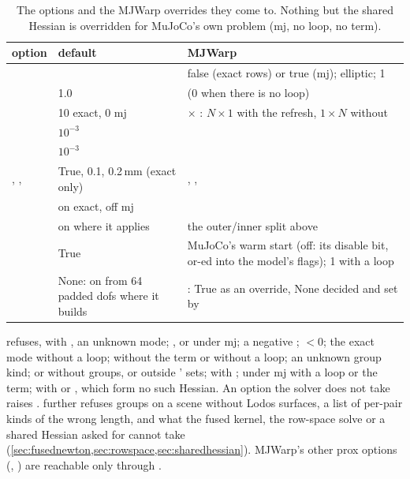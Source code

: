 \begin{table}[t]
\centering
\caption{The options and the MJWarp overrides they come to. Nothing but the shared Hessian is overridden for MuJoCo's own problem (mj, no loop, no term).}
\label{tab:pcmap}
\small
\begin{tabularx}{\linewidth}{@{}L{40mm}L{30mm}Y@{}}
\toprule
option & default & MJWarp \\
\midrule
{} &  &  false (exact rows) or true (mj);  elliptic;  1 \\
 & 1.0 &  (0 when there is no loop) \\
 & 10 exact, 0 mj &  $\times$ : $N \times 1$ with the refresh, $1 \times N$ without \\
 & $10^{-3}$ &  \\
 & $10^{-3}$ &  \\
, ,  & True, 0.1, 0.2\,mm (exact only) & , ,  \\
 & on exact, off mj &  \\
 & on where it applies & the outer/inner split above \\
 & True & MuJoCo's warm start (off: its disable bit, or-ed into the model's flags);  1 with a loop \\
 & None: on from 64 padded dofs where it builds & : True as an override, None decided and set by  \\
\bottomrule
\end{tabularx}
\end{table}

\begin{sloppypar}
 refuses, with , an unknown mode; ,  or  under mj; a negative ;  $< 0$; the exact mode without a loop;  without the term or without a loop; an unknown group kind;  or  without groups, or outside ' sets;  with ;  under mj with a loop or the term;  with  or , which form no such Hessian. An option the solver does not take raises .  further refuses groups on a scene without Lodos surfaces, a list of per-pair kinds of the wrong length, and what the fused kernel, the row-space solve or a shared Hessian asked for cannot take (\cref{sec:fusednewton,sec:rowspace,sec:sharedhessian}). MJWarp's other prox options (, ) are reachable only through .
\end{sloppypar}

